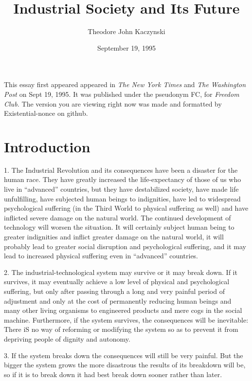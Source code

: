 \documentclass{article}
\title{Industrial Society and Its Future}
\author{\small{Theodore John Kaczynski}}
\date{\small{September 19, 1995}}
\begin{document}
\maketitle
\small{This essay first appeared appeared in \textit{The New York Times} and \textit{The Washington Post} on Sept 19, 1995. It was published under the pseudonym FC, for \textit{Freedom Club.} The version you are viewing right now was made and formatted by Existential-nonce on github.}
\clearpage

\section{Introduction}
\hspace{0.5cm} 1.  The Industrial Revolution and its consequences have been a disaster for the human race.  They have greatly  increased  the  life-expectancy  of  those  of  us  who  live  in  “advanced”  countries, but they  have  destabilized  society,  have  made  life  unfulfilling,  have  subjected  human  beings  to indignities,  have  led  to  widespread  psychological  suffering  (in  the  Third  World  to  physical suffering  as  well)  and  have  inflicted  severe  damage  on  the  natural  world.   The  continued  
development  of  technology  will  worsen  the  situation.   It  will  certainly  subject  human  being to greater indignities and inflict greater damage on the natural world, it will probably lead to greater 
social disruption and psychological suffering, and it may lead to increased physical suffering even 
in “advanced” countries. \vspace{\baselineskip}

2.  The industrial-technological system may survive or it may break down.  If it survives, it may 
eventually  achieve  a  low  level  of  physical  and  psychological  suffering,  but  only  after  passing  through a long and very painful period of adjustment and only at the cost of permanently reducing human beings and many other living organisms to engineered products and mere cogs in the social 
machine.   Furthermore,  if  the  system  survives,  the  consequences  will  be  inevitable:  There  iS no  way of reforming or modifying the system so as to prevent it from depriving people of dignity and 
autonomy. \vspace{\baselineskip}

3.  If the system breaks down the consequences will still be very painful.  But the bigger the system 
grows the more disastrous the results of its breakdown will be, so if it is to break down it had best 
break down sooner rather than later. \vspace{\baselineskip}
\end{document}
